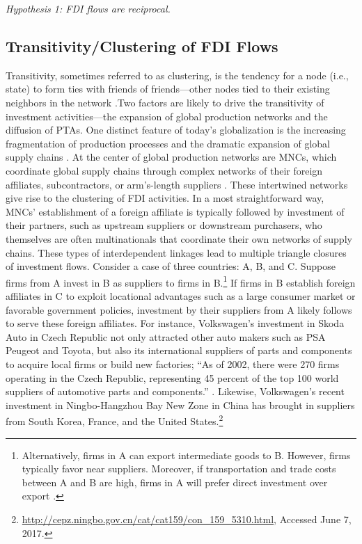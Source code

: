 \documentclass[reqno,onecolumn,letterpaper,12pt]{article}
\begin{document}
\begin{center}
\textit{Hypothesis 1: FDI flows are reciprocal.}
\end{center}


\subsection{Transitivity/Clustering of FDI Flows}
Transitivity, sometimes referred to as clustering, is the tendency for a node (i.e., state) to form ties with friends of friends---other nodes tied to their existing neighbors in the network \citep{holland1971transitivity}.Two factors are likely to drive the transitivity of investment activities---the expansion of global production networks and the diffusion of PTAs.  One distinct feature of today's globalization is the increasing fragmentation of production processes and the dramatic expansion of global supply chains \citep{UNCTAD:2013}. At the center of global production networks are MNCs, which coordinate global supply chains through complex networks of their foreign affiliates, subcontractors, or arm's-length suppliers \citep[xxii]{UNCTAD:2013}. These intertwined networks give rise to the clustering of FDI activities. In a most straightforward way, MNCs' establishment of a foreign affiliate is typically followed by investment of their partners, such as upstream suppliers or downstream purchasers, who themselves are often multinationals that coordinate their own networks of supply chains. These types of interdependent linkages lead to multiple triangle closures of investment flows. Consider a case of three countries: A, B, and C. Suppose firms from A invest in B as suppliers to firms in B.\footnote{Alternatively, firms in A can export intermediate goods to B. However, firms typically favor near suppliers. Moreover, if transportation and trade costs between A and B are high, firms in A will prefer direct investment over export \citep{Carr_et_al:2001}. } If firms in B establish foreign affiliates in C to exploit locational advantages such as a large consumer market or favorable government policies, investment by their suppliers from A likely follows to serve these foreign affiliates. For instance, Volkswagen's investment in Skoda Auto in Czech Republic not only attracted other auto makers such as PSA Peugeot and Toyota, but also its international suppliers of parts and components to acquire local firms or build new factories; ``As of 2002, there were 270 firms operating in the Czech Republic, representing 45 percent of the top 100 world suppliers of automotive parts and components.'' \citep[352]{Kaminski_Javorcik:2005}. Likewise, Volkswagen's recent investment in Ningbo-Hangzhou Bay New Zone in China has brought in suppliers from South Korea, France, and the United States.\footnote{\url{http://cepz.ningbo.gov.cn/cat/cat159/con_159_5310.html}, Accessed June 7, 2017.}
\end{document}

